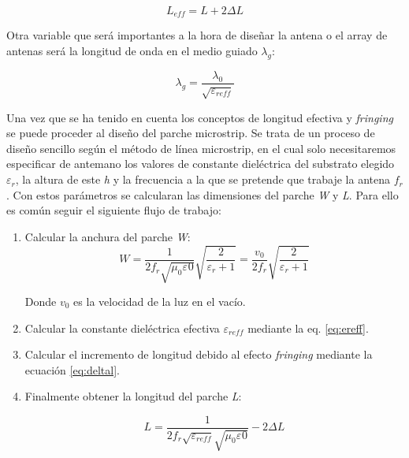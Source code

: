 \begin{equation}
	L_{eff}=L+2\Delta L
	\label{eq:leff}
\end{equation}

\par Otra variable que será importantes a la hora de diseñar la antena o el array de antenas será la longitud de onda en el medio guiado $\lambda_{g}$:

\begin{equation}
	\lambda_{g}=\frac{\lambda_{0}}{\sqrt{\varepsilon _{reff}}}
	\label{eq:lambdaguided}
\end{equation}


\par Una vez que se ha tenido en cuenta los conceptos de longitud efectiva y \textit{fringing} se puede proceder al diseño del parche microstrip. Se trata de un proceso de diseño sencillo según el método de línea microstrip, en el cual solo necesitaremos especificar de antemano los valores de constante dieléctrica del substrato elegido $\varepsilon_{r}$, la altura de este \textit{h} y la frecuencia a la que se pretende que trabaje la antena \textit{$f_{r}$}. Con estos parámetros se calcularan las dimensiones del parche \textit{W} y \textit{L}. Para ello es común seguir el siguiente flujo de trabajo:

\begin{enumerate}
  \item Calcular la anchura del parche \textit{W}:
  \begin{equation}
	W=\frac{1}{2f_{r}\sqrt{\mu _{0}\varepsilon _{}0}}\sqrt{\frac{2}{\varepsilon _{r}+1}}=\frac{v_{0}}{2f_{r}}\sqrt{\frac{2}{\varepsilon _{r}+1}}
	\label{eq:W}
\end{equation}

Donde $v_{0}$ es la velocidad de la luz en el vacío.

  \item Calcular la constante dieléctrica efectiva $\varepsilon_{reff}$ mediante la eq. \ref{eq:ereff}.
  
  \item Calcular el incremento de longitud debido al efecto \textit{fringing} mediante la ecuación \ref{eq:deltal}.
  
  \item Finalmente obtener la longitud del parche \textit{L}:
  
   \begin{equation}
	L=\frac{1}{2f_{r}\sqrt{\varepsilon _{reff}}\sqrt{\mu _{0}\varepsilon _{}0}}-2\Delta L
	\label{eq:L}
\end{equation}
\end{enumerate}


